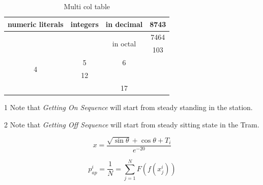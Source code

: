 \documentclass{article}
\begin{document}
\begin{table}[h!]
    \centering
    \caption{Multi col table}
    
    \begin{tabularx}{0.8\textwidth}{|c|c|c|c|}
        \hline
        \multirow{10}{*}{numeric literals} & \multirow{5}{*}{integers} & in decimal & 8743\\
        \hline
        & &  \multirow{2}{*}{in octal} & 7464\\
        \hline
        & & & 103\\
        \multirow{2}{*}{4}  & 5 & 6\\
        \cline{3-4}
        
        \hline
        \multicolumn{2}{|c|}{\multirow{2}{*}{10}} & 12\\
        \cline{3-3}
        \multicolumn{2}{|c|}{} & 17 \\
        \hline
        
    \end{tabularx}
    \begin{tablenotes}
      \item[1] Note that \textit{Getting On Sequence} will start from steady standing in the station.
      \item[2] Note that \textit{Getting Off Sequence} will start from steady sitting state in the Tram.
   \end{tablenotes}
    \label{tab:Multi col table}
\end{table}


\begin{equation}
    x = \frac{\sqrt{\sin{\theta}}+{\cos{\theta}}+T_i}{e^{-20}}
\end{equation}


\begin{equation}
    p_{ap}^{i} = 
    \frac{1}{N} = \sum_{j=1}^{N}F(f(x_{j}^{i}))
\end{equation}
\end{document}
